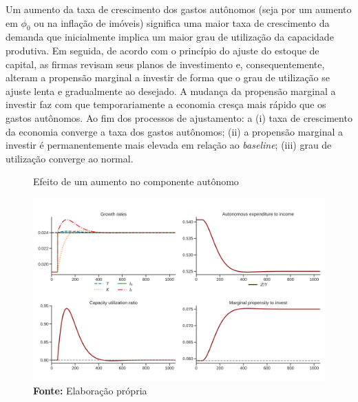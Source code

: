 
Um aumento da taxa de crescimento dos gastos autônomos (seja por um aumento em $\phi_0$ ou na inflação de imóveis) significa uma maior taxa de crescimento da demanda que inicialmente implica um maior grau de utilização da capacidade produtiva. Em seguida, de acordo com o princípio do ajuste do estoque de capital, as firmas revisam seus planos de investimento e, consequentemente, alteram a propensão marginal a investir de forma que o grau de utilização se ajuste lenta e gradualmente ao desejado. A mudança da propensão marginal a investir faz com que temporariamente a economia cresça mais rápido que os gastos autônomos. Ao fim dos processos de ajustamento: a (i) taxa de crescimento da economia converge a taxa dos gastos autônomos; (ii) a propensão marginal a investir é permanentemente mais elevada em relação ao \textit{baseline}; (iii) grau de utilização converge ao normal.



\begin{figure}[H]
	\centering
	\caption{Efeito de um aumento no componente autônomo}
	\label{choque_1}
	\includegraphics[width=\textwidth]{../../Modelo/Versoes/Shock_1.png}
	\caption*{\textbf{Fonte:} Elaboração própria}
\end{figure}


